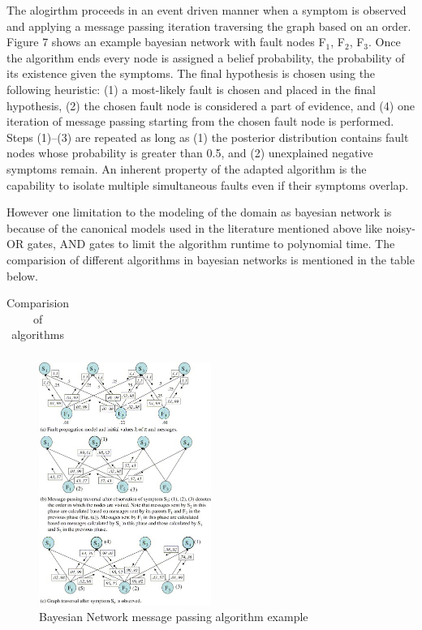 \documentclass[10pt]{sigplan-proc-varsize}
\begin{document}
The alogirthm proceeds in an event driven manner when a symptom is observed and applying a message passing iteration traversing the graph based on an order. Figure 7 shows an example bayesian network with fault nodes F$_1$, F$_2$, F$_3$. Once the algorithm ends every node is assigned a belief probability, the probability of its existence given the symptoms. The final hypothesis is chosen using the following heuristic: (1) a most-likely fault is chosen and placed in the final hypothesis, (2) the chosen fault node is considered a part of evidence, and (4) one iteration of message passing starting from the chosen fault node is performed. Steps (1)–(3) are repeated as long as (1) the posterior distribution contains fault nodes whose probability is greater than 0.5, and (2) unexplained negative symptoms remain. An inherent property of the adapted algorithm is the capability to isolate multiple simultaneous faults even if their symptoms overlap. 

However one limitation to the modeling of the domain as bayesian network is because of the canonical models used in the literature mentioned above like noisy-OR gates, AND gates to limit the algorithm runtime to polynomial time. The comparision of different algorithms in bayesian networks is mentioned in the table below.

\begin{table}[h]\footnotesize
  \caption{Comparision of algorithms}
  \begin{tabular}{| r | r || c | c | c |}
  \end{tabular}
\end{table}

\begin{figure}[h!]
  \caption{Bayesian Network message passing algorithm example}
  \centering
    \includegraphics[width=0.5\textwidth]{Fig7}
\end{figure}
\end{document}
